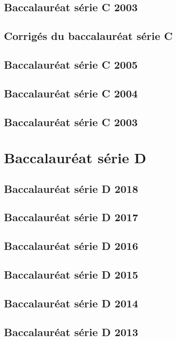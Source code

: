 \section{Baccalauréat série C 2003}

\newpage
\begin{corrige}
\chapter{Corrigés du baccalauréat série C}
\section{Baccalauréat série C 2005}
{\color{loko2}}
\newpage
\section{Baccalauréat série C 2004}
{\color{loko2}}
\newpage
\section{Baccalauréat série C 2003}
{\color{loko2}}
\newpage
\end{corrige}
\chapter{Baccalauréat série D}
\section{Baccalauréat série D 2018}

\newpage
\section{Baccalauréat série D 2017}

\newpage
\section{Baccalauréat série D 2016}

\newpage
\section{Baccalauréat série D 2015}

\newpage
\section{Baccalauréat série D 2014}

\newpage
\section{Baccalauréat série D 2013}

\newpage
